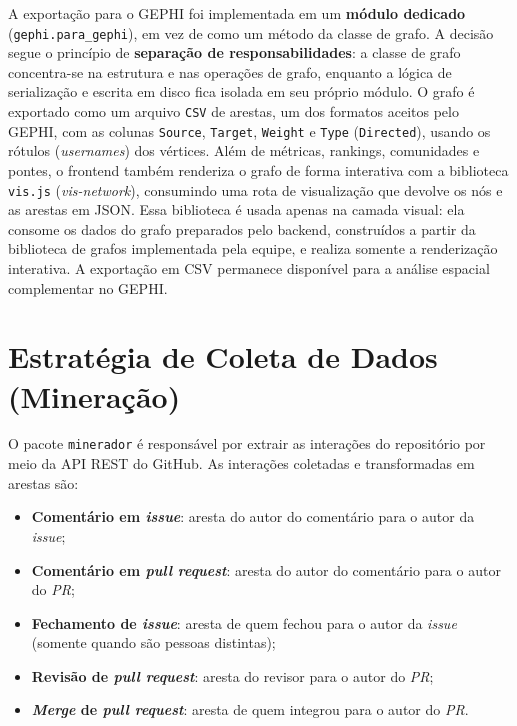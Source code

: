 \documentclass[12pt]{article}
\begin{document}
A exportação para o GEPHI foi implementada em um \textbf{módulo dedicado}
(\texttt{gephi.para\_gephi}), em vez de como um método da classe de grafo. A
decisão segue o princípio de \textbf{separação de responsabilidades}: a classe de
grafo concentra-se na estrutura e nas operações de grafo, enquanto a lógica de
serialização e escrita em disco fica isolada em seu próprio módulo. O grafo é
exportado como um arquivo \texttt{CSV} de arestas, um dos formatos aceitos
pelo GEPHI, com as colunas \texttt{Source}, \texttt{Target}, \texttt{Weight}
e \texttt{Type} (\texttt{Directed}), usando os rótulos (\emph{usernames}) dos
vértices. Além de métricas, rankings, comunidades e pontes, o frontend também
renderiza o grafo de forma interativa com a biblioteca \texttt{vis.js}
(\emph{vis-network}), consumindo uma rota de visualização que devolve os nós e as
arestas em JSON. Essa biblioteca é usada apenas na camada visual: ela consome os
dados do grafo preparados pelo backend, construídos a partir da biblioteca de
grafos implementada pela equipe, e realiza somente a renderização interativa. A
exportação em CSV permanece disponível para a análise espacial complementar no
GEPHI.

\section{Estratégia de Coleta de Dados (Mineração)}
\label{sec:mineracao}

O pacote \texttt{minerador} é responsável por extrair as interações do
repositório por meio da API REST do GitHub. As interações coletadas e
transformadas em arestas são:

\begin{itemize}
  \item \textbf{Comentário em \emph{issue}}: aresta do autor do comentário para o
        autor da \emph{issue};
  \item \textbf{Comentário em \emph{pull request}}: aresta do autor do comentário
        para o autor do \emph{PR};
  \item \textbf{Fechamento de \emph{issue}}: aresta de quem fechou para o autor da
        \emph{issue} (somente quando são pessoas distintas);
  \item \textbf{Revisão de \emph{pull request}}: aresta do revisor para o autor do
        \emph{PR};
  \item \textbf{\emph{Merge} de \emph{pull request}}: aresta de quem integrou para
        o autor do \emph{PR}.
\end{itemize}
\end{document}
